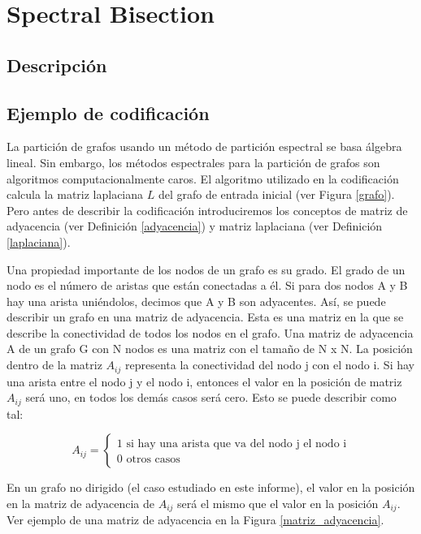 \newpage
\section{Spectral Bisection}\label{Spectral-Bisection}

\subsection{Descripción}

\subsection{Ejemplo de codificación}

La partición de grafos usando un método de partición espectral se basa álgebra lineal. Sin embargo, los métodos espectrales para la partición de grafos son algoritmos computacionalmente caros. El algoritmo utilizado en la codificación calcula la matriz laplaciana $L$ del grafo de entrada inicial (ver Figura \ref{grafo}). Pero antes de describir la codificación introduciremos los conceptos de matriz de adyacencia (ver Definición \ref{adyacencia}) y matriz laplaciana (ver Definición \ref{laplaciana}).

\begin{mydef}\label{adyacencia}
	Una propiedad importante de los nodos de un grafo es su grado. El grado de un nodo es el número de aristas que están conectadas a él. Si para dos nodos A y B hay una arista uniéndolos, decimos que A y B son adyacentes. Así, se puede describir un grafo en una matriz de adyacencia. Esta es una matriz en la que se describe la conectividad de todos los nodos en el grafo. Una matriz de adyacencia A de un grafo G con N nodos es una matriz con el tamaño de N x N. La posición dentro de la matriz $A_{ij}$ representa la conectividad del nodo j con el nodo i. Si hay una arista entre el nodo j y el nodo i, entonces el valor en la posición de matriz $A_{ij}$ será uno, en todos los demás casos será cero. Esto se puede describir como tal:
	\begin{center}
		$$
		A_{ij} = 
		\begin{cases}
			\text{1 si hay una arista que va del nodo j el nodo i} \\
			\text{0 otros casos}
		\end{cases}
		$$
	\end{center}
	En un grafo no dirigido (el caso estudiado en este informe), el valor en la posición en la matriz de adyacencia de $A_{ij}$ será el mismo que el valor en la posición $A_{ij}$. Ver ejemplo de una matriz de adyacencia en la Figura \ref{matriz_adyacencia}.
\end{mydef}


